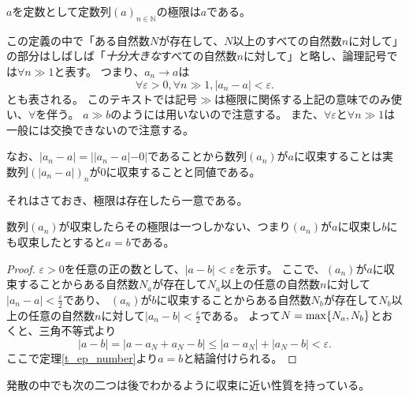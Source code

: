 \begin{example}
$a$を定数として定数列$(a)_{n \in \mathbb{N}}$の極限は$a$である。
\end{example}

この定義の中で「ある自然数$N$が存在して、$N$以上のすべての自然数$n$に対して」の部分はしばしば「\emph{十分大きな}すべての自然数$n$に対して」と略し、論理記号では$\forall n \gg 1$と表す。
つまり、$a_n \to a$は
$$
\forall \varepsilon > 0, \forall n \gg 1, |a_n-a| < \varepsilon.
$$
とも表される。
このテキストでは記号$\gg$は極限に関係する上記の意味でのみ使い、$\forall$を伴う。
$a \gg b$のようには用いないので注意する。
また、$\forall \varepsilon$と$\forall n \gg 1$は一般には交換できないので注意する。

なお、$|a_n-a| = ||a_n-a|-0|$であることから数列$(a_n)$が$a$に収束することは実数列$(|a_n-a|)_n$が$0$に収束することと同値である。

それはさておき、極限は存在したら一意である。

\begin{proposition}
数列$(a_n)$が収束したらその極限は一つしかない、つまり$(a_n)$が$a$に収束し$b$にも収束したとすると$a = b$である。
\end{proposition}

\begin{proof}
$\varepsilon > 0$を任意の正の数として、$|a-b| < \varepsilon$を示す。
ここで、$(a_n)$が$a$に収束することからある自然数$N_a$が存在して$N_a$以上の任意の自然数$n$に対して$|a_n-a| < \frac{\varepsilon}{2}$であり、
$(a_n)$が$b$に収束することからある自然数$N_b$が存在して$N_b$以上の任意の自然数$n$に対して$|a_n-b| < \frac{\varepsilon}{2}$である。
よって$N = \max\{ N_a, N_b \}$とおくと、三角不等式より
$$
|a-b| = |a-a_N+a_N-b| \le |a-a_N|+|a_N-b| < \varepsilon.
$$
ここで定理\ref{t_ep_number}より$a = b$と結論付けられる。
\end{proof}

発散の中でも次の二つは後でわかるように収束に近い性質を持っている。

